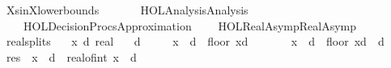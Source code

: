 %
\begin{isabellebody}%
%
%
\isadelimtheory
%
\endisadelimtheory
%
\isatagtheory
{}\isamarkupfalse%
\ XsinX{\isacharunderscore}{\kern0pt}lower{\isacharunderscore}{\kern0pt}bounds\isanewline
\ \ \isanewline
\ \ \ \ {\isachardoublequoteopen}HOL{\isacharminus}{\kern0pt}Analysis{\isachardot}{\kern0pt}Analysis{\isachardoublequoteclose}\isanewline
\ \ \ \ {\isachardoublequoteopen}HOL{\isacharminus}{\kern0pt}Decision{\isacharunderscore}{\kern0pt}Procs{\isachardot}{\kern0pt}Approximation{\isachardoublequoteclose}\isanewline
\ \ \ \ {\isachardoublequoteopen}HOL{\isacharminus}{\kern0pt}Real{\isacharunderscore}{\kern0pt}Asymp{\isachardot}{\kern0pt}Real{\isacharunderscore}{\kern0pt}Asymp{\isachardoublequoteclose}\isanewline
\isanewline
{}%
\endisatagtheory
{\isafoldtheory}%
%
\isadelimtheory
%
\endisadelimtheory
%
\isadelimdocument
%
\endisadelimdocument
%
\isatagdocument
%
\isamarkuptrue%
%
\isamarkuptrue%
%
\endisatagdocument
{\isafolddocument}%
%
\isadelimdocument
%
\endisadelimdocument
{}\isamarkupfalse%
\ real{\isacharunderscore}{\kern0pt}splits{\isacharcolon}{\kern0pt}\isanewline
\ \ \ x\ d\ {\isacharcolon}{\kern0pt}{\isacharcolon}{\kern0pt}real\isanewline
\ \ \ {\isachardoublequoteopen}d\ {\isachargreater}{\kern0pt}\ {}{\isachardoublequoteclose}\isanewline
\ \ \ {\isachardoublequoteopen}x\ {\isacharminus}{\kern0pt}\ d\ {\isacharasterisk}{\kern0pt}\ floor\ {\isacharparenleft}{\kern0pt}x{\isacharslash}{\kern0pt}d{\isacharparenright}{\kern0pt}\ {\isasymge}\ {}{\isachardoublequoteclose}\isanewline
\ \ \ \ \ {\isachardoublequoteopen}x\ {\isacharminus}{\kern0pt}\ d\ {\isacharasterisk}{\kern0pt}\ floor\ {\isacharparenleft}{\kern0pt}x{\isacharslash}{\kern0pt}d{\isacharparenright}{\kern0pt}\ {\isacharless}{\kern0pt}\ d{\isachardoublequoteclose}\isanewline
%
\isadelimproof
%
\endisadelimproof
%
\isatagproof
{}\isamarkupfalse%
{\isacharminus}{\kern0pt}\isanewline
\ \ \isamarkupfalse%
\ {\isacharquery}{\kern0pt}res\ {\isacharequal}{\kern0pt}\ {\isachardoublequoteopen}x\ {\isacharminus}{\kern0pt}\ d\ {\isacharasterisk}{\kern0pt}\ real{\isacharunderscore}{\kern0pt}of{\isacharunderscore}{\kern0pt}int\ {\isasymlfloor}x\ {\isacharslash}{\kern0pt}\ d{\isasymrfloor}{\isachardoublequoteclose}\isanewline

\end{isabellebody}
